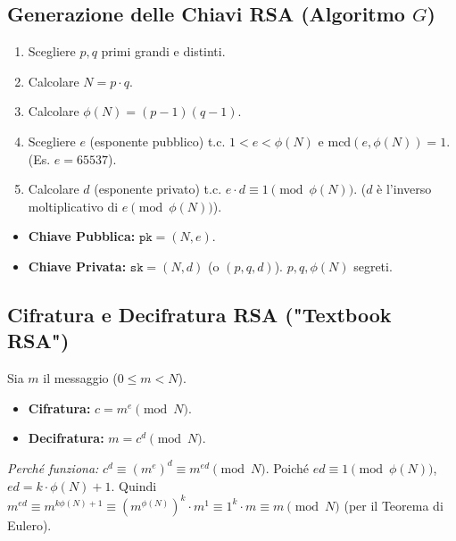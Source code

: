 \subsection{Generazione delle Chiavi RSA (Algoritmo $G$)}
\begin{enumerate}
    \item Scegliere $p, q$ primi grandi e distinti.
    \item Calcolare $N = p \cdot q$.
    \item Calcolare $\phi(N) = (p-1)(q-1)$.
    \item Scegliere $e$ (esponente pubblico) t.c. $1 < e < \phi(N)$ e $\text{mcd}(e, \phi(N)) = 1$. (Es. $e=65537$).
    \item Calcolare $d$ (esponente privato) t.c. $e \cdot d \equiv 1 \pmod{\phi(N)}$. ($d$ è l'inverso moltiplicativo di $e \pmod{\phi(N)}$).
\end{enumerate}
\begin{itemize}
    \item \textbf{Chiave Pubblica:} $\texttt{pk} = (N, e)$.
    \item \textbf{Chiave Privata:} $\texttt{sk} = (N, d)$ (o $(p, q, d)$). $p, q, \phi(N)$ segreti.
\end{itemize}

\subsection{Cifratura e Decifratura RSA ("Textbook RSA")}
Sia $m$ il messaggio ($0 \le m < N$).
\begin{itemize}
    \item \textbf{Cifratura:} $c = m^e \pmod N$.
    \item \textbf{Decifratura:} $m = c^d \pmod N$.
\end{itemize}
\textit{Perché funziona:} $c^d \equiv (m^e)^d \equiv m^{ed} \pmod N$. Poiché $ed \equiv 1 \pmod{\phi(N)}$, $ed = k \cdot \phi(N) + 1$.
Quindi $m^{ed} \equiv m^{k\phi(N)+1} \equiv (m^{\phi(N)})^k \cdot m^1 \equiv 1^k \cdot m \equiv m \pmod N$ (per il Teorema di Eulero).

